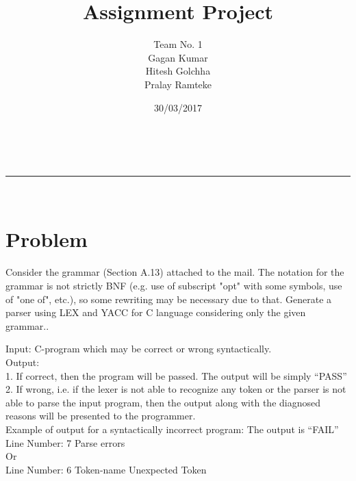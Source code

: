 \documentclass[a4paper,11pt]{article}
\makeatletter
\newcommand{\linia}{\rule{\linewidth}{0.5pt}}
\theoremstyle{mytheor}
\renewcommand{\maketitle}{
\begin{center}
\vspace{2ex}
{\huge \textsc{\@title}}
\vspace{1ex}
\\
\linia\\
\@author \hfill \@date
\vspace{4ex}
\end{center}
}
\makeatother
\begin{document}
\title{Assignment Project}

\author{ Team No. 1 \\ Gagan Kumar  \\ Hitesh Golchha \\ Pralay Ramteke \\ }

\date{30/03/2017}

\maketitle

\section*{Problem}

Consider the grammar (Section A.13) attached to the mail.
The notation for the grammar is not strictly BNF (e.g. use of subscript "opt" with some symbols, use of "one of", etc.), so some rewriting may be necessary due to that.
Generate a parser using LEX and YACC for C language considering only the given grammar..

Input: C-program which may be correct or wrong syntactically.  \\ 
Output: \\
1. If correct, then the program will be passed. The output will be simply “PASS” \\
2. If wrong, i.e. if the lexer is not able to recognize any token or the parser is not able to parse the input program, then the output along with the diagnosed reasons will be presented to the programmer. \\

Example of output for a syntactically incorrect program: The output is “FAIL” \\
Line Number: 7 Parse errors \\
Or \\ 
Line Number: 6 Token-name Unexpected Token \\
\end{document}
